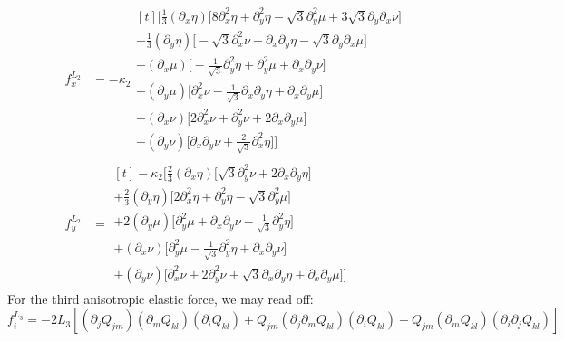 \documentclass[reqno]{article}
\begin{document}
\begin{equation}
\begin{split}
	f^{L_2}_x &=
	-\kappa_2
	\begin{multlined}[t]
	\biggl[
	\tfrac13 \left(\partial_x \eta\right)
	\bigl[
	8 \partial_x^2 \eta 
	+ \partial_y^2 \eta 
	- \sqrt3 \partial_y^2 \mu
	+ 3\sqrt{3} \partial_y \partial_x \nu 
	\bigr] \\
	+ \tfrac13 \left( \partial_y \eta \right)
	\bigl[
	- \sqrt3 \partial_x^2 \nu 
	+ \partial_x \partial_y \eta 
	- \sqrt3 \partial_y \partial_x \mu 
	\bigr] \\ 
	+ \left( \partial_x \mu \right)
	\bigl[
	- \tfrac{1}{\sqrt3} \partial_y^2 \eta
	+ \partial_y^2 \mu 
	+ \partial_x \partial_y \nu
	\bigr] \\
	+ \left(\partial_y \mu \right)
	\bigl[
	\partial_x^2 \nu 
	- \tfrac{1}{\sqrt3} \partial_x \partial_y \eta
	+ \partial_x \partial_y \mu
	\bigr] \\
	+ \left( \partial_x \nu \right)
	\bigl[
	2 \partial_x^2 \nu 
	+ \partial_y^2 \nu 
	+ 2 \partial_x \partial_y \mu
	\bigr] \\
	+ \left(\partial_y \nu \right) 
	\bigl[\partial_x \partial_y \nu
	+ \tfrac{2}{\sqrt3} \partial_x^2 \eta \bigr]
	\biggr]
	\end{multlined} \\
	f^{L_2}_y &=
	\begin{multlined}[t]
	-\kappa_2 \biggl[
	\tfrac23 \left( \partial_x \eta \right)
	\bigl[
	\sqrt3 \partial_y^2 \nu 
	+ 2 \partial_x \partial_y \eta
	\bigr] \\
	+ \tfrac23 \left( \partial_y \eta \right)
	\bigl[
	2 \partial_x^2 \eta
	+ \partial_y^2 \eta
	- \sqrt3 \partial_y^2 \mu
	\bigr] \\
	+ 2 \left( \partial_y \mu \right)
	\bigl[
	\partial_y^2 \mu 
	+ \partial_x \partial_y \nu
	- \tfrac{1}{\sqrt3} \partial_y^2 \eta
	\bigr]  \\
	+ \left( \partial_x \nu \right)
	\bigl[
	\partial_y^2 \mu 
	- \tfrac{1}{\sqrt3} \partial_y^2 \eta 
	+ \partial_x \partial_y \nu
	\bigr] \\
	+ \left( \partial_y \nu \right)
	\bigl[
	\partial_x^2 \nu
	+ 2 \partial_y^2 \nu 
	+ \sqrt3 \partial_x \partial_y \eta 
	+ \partial_x \partial_y \mu
	\bigr]
	\biggr]
	\end{multlined}
\end{split}
\end{equation}
For the third anisotropic elastic force, we may read off:
\begin{equation}
	f^{L_3}_i
	= 
	-2 L_3 \left[
	\left( \partial_j Q_{jm} \right) \left( \partial_m Q_{kl} \right) \left( \partial_i Q_{kl} \right)
	+ Q_{jm} \left( \partial_j \partial_m Q_{kl} \right) \left( \partial_i Q_{kl} \right)
	+ Q_{jm} \left( \partial_m Q_{kl} \right) \left( \partial_i \partial_j Q_{kl} \right)
	\right]
\end{equation}
\end{document}
